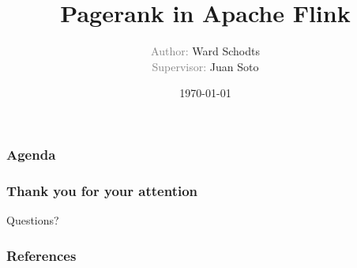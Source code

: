\documentclass[hyperref={pdfpagelayout=SinglePage}]{beamer}
\author{\textcolor{gray}{Author:} Ward Schodts\\ \textcolor{gray}{Supervisor:}
Juan Soto}
\title{Pagerank in Apache Flink}
\institute{Datenbanksysteme und Informationsmanagement \\
Technische Universität Berlin \\[0.5cm]
\texttt{[image: tulogo]}}
\date{\today}
\begin{document}
\begin{frame}
\maketitle
\end{frame}

\begin{frame}
\frametitle{Agenda}
\tableofcontents
\end{frame}









\begin{frame}
\frametitle{Thank you for your attention}
\begin{center}
{\LARGE Questions?}
\end{center}



\end{frame}

\begin{frame}[allowframebreaks]
		
        \frametitle{References}
        \nocite{*}
        \printbibliography

\end{frame}
\end{document}
